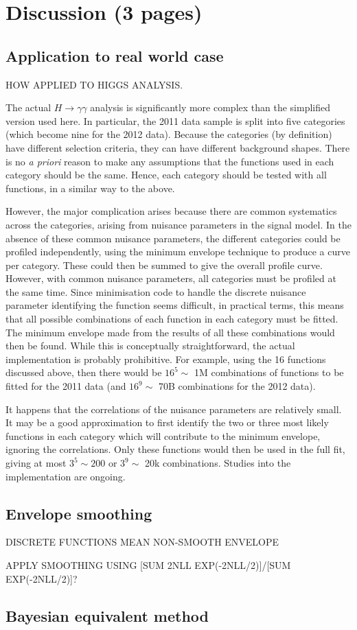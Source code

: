 \section{Discussion (3 pages)}
\label{sec:discussion}

\subsection{Application to real world case}
\label{sec:discussion:higgs}

HOW APPLIED TO HIGGS ANALYSIS.

The actual $H \rightarrow \gamma\gamma$ analysis is significantly more
complex than the simplified version used here. In particular, the 2011 data
sample is split into five categories (which become nine for the 2012 data).
Because the categories (by definition) have different selection criteria,
they can have different background shapes.
There is no {\it a priori} reason to make any assumptions that the functions
used in each category should be the same. Hence, each category should be
tested with all functions, in a similar way to the above.

However, the major complication arises because there are common systematics 
across the categories, arising from nuisance parameters in the signal
model.
In the absence of these common nuisance parameters,
the different categories could be profiled independently, using the
minimum envelope technique to produce a curve per category. These could then
be summed to give the overall profile curve. However, with common
nuisance parameters, all categories must be profiled at the same time.
Since minimisation code to handle the 
discrete nuisance parameter identifying the
function seems difficult, in practical terms, this means that all possible
combinations of each function in each category must be fitted.
The minimum envelope made from the results of all these combinations would
then be found. While this is conceptually straightforward, the actual
implementation is probably prohibitive. For example, using the 16 functions
discussed above, then there would be $16^5 \sim$ 1M combinations of functions
to be fitted for the 2011 data (and $16^9 \sim$ 70B combinations for the
2012 data).

It happens that the correlations of the nuisance parameters
are relatively small.
It may be a good approximation 
to first identify the two or three most likely functions in each category
which will contribute to the minimum envelope, ignoring the correlations.
Only these functions would then be used in the full fit, giving at most
$3^5 \sim 200$ or $3^9 \sim$ 20k combinations. Studies into the 
implementation are ongoing.

\subsection{Envelope smoothing}
\label{sec:discussion:smoothing}

DISCRETE FUNCTIONS MEAN NON-SMOOTH ENVELOPE

APPLY SMOOTHING USING [SUM 2NLL EXP(-2NLL/2)]/[SUM EXP(-2NLL/2)]?


\subsection{Bayesian equivalent method}
\label{sec:discussion:bayesian}
